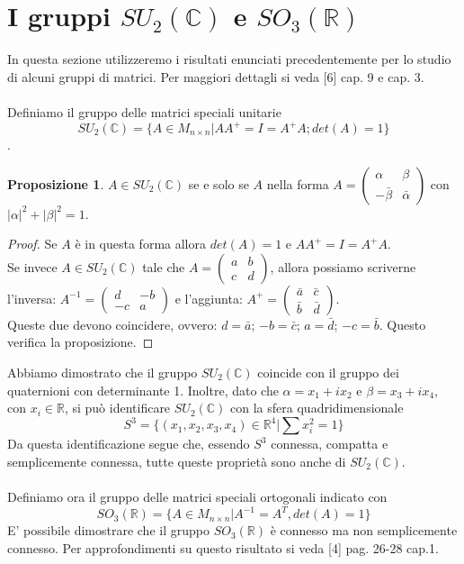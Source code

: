 \documentclass[12pt,a4paper]{report}
\theoremstyle{definition}
\theoremstyle{Theorem}
\newtheorem{Prop}[Def]{Proposizione}
\theoremstyle{definition}
\theoremstyle{definition}
\theoremstyle{definition}
\begin{document}
\section{I gruppi $SU_2(\mathbb{C})$ e $SO_3(\mathbb{R})$} 
In questa sezione utilizzeremo i risultati enunciati precedentemente per lo studio di alcuni gruppi di matrici. Per maggiori dettagli si veda [6] cap. 9 e cap. 3.\\
\\
Definiamo il gruppo delle matrici speciali unitarie $$SU_2(\mathbb{C})=\{A\in M_{n\times n}|AA^{+}=I=A^{+}A;det(A)=1\}$$.
\begin{Prop}
	$A\in SU_2(\mathbb{C})$ se e solo se $A$ nella forma $A=
	\begin{pmatrix}
		\alpha & \beta \\
		-\bar{\beta} & \bar{\alpha}
	\end{pmatrix}
	$ con $|\alpha|^2+|\beta|^2=1$.
\end{Prop}
\begin{proof}
	Se $A$ è in questa forma allora $det(A)=1$ e $AA^{+}=I=A^{+}A$.\\
	Se invece $A\in SU_2(\mathbb{C})$ tale che $A=
	\begin{pmatrix}
		a & b \\
		c & d
	\end{pmatrix}$, allora possiamo scriverne l'inversa:
$A^{-1}=\begin{pmatrix}
	d & -b \\
	-c & a
\end{pmatrix}$ e l'aggiunta: $A^+=
\begin{pmatrix}
	\bar{a} & \bar{c} \\
	\bar{b} & \bar{d}
\end{pmatrix}$.\\
Queste due devono coincidere, ovvero: $d=\bar{a}$; $-b=\bar{c}$; $a=\bar{d}$; $-c=\bar{b}$. Questo verifica la proposizione.
\end{proof}
Abbiamo dimostrato che il gruppo $SU_2(\mathbb{C})$ coincide con il gruppo dei quaternioni con determinante 1.
Inoltre, dato che $\alpha=x_1+ix_2$ e $\beta=x_3+ix_4$, con $x_i\in\mathbb{R}$, si può identificare $SU_2(\mathbb{C})$ con la sfera quadridimensionale $$S^3=\{(x_1,x_2,x_3,x_4)\in \mathbb{R}^4|\sum x_i^2=1\}$$
Da questa identificazione segue che, essendo $S^3$ connessa, compatta e semplicemente connessa, tutte queste proprietà sono anche di $SU_2(\mathbb{C})$.
\\\\
Definiamo ora il gruppo delle matrici speciali ortogonali indicato con $$SO_3(\mathbb{R})=\{A\in M_{n\times n}|A^{-1}=A^T, det(A)=1\}$$
E' possibile dimostrare che il gruppo $SO_3(\mathbb{R})$ è connesso ma non semplicemente connesso. Per approfondimenti su questo risultato si veda [4] pag. 26-28 cap.1.
\end{document}
